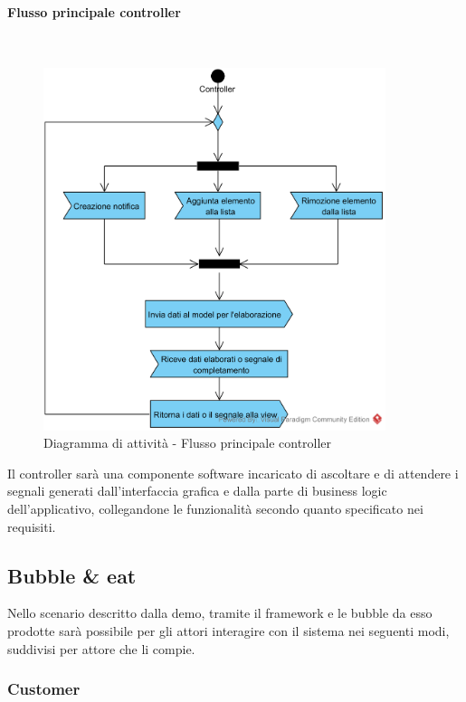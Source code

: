 \paragraph{Flusso principale controller}\mbox{}\\
\nopagebreak
\begin{figure}[H]
	\centering
	\includegraphics[width=10cm]{../../documenti/SpecificaTecnica/diagrammi_img/attivita/todo_controller.png}
	\caption{Diagramma di attività - Flusso principale controller}
\end{figure}


Il controller sarà una componente software incaricato di ascoltare e di attendere i segnali generati dall'interfaccia grafica e dalla parte di business logic dell'applicativo, collegandone le funzionalità secondo quanto specificato nei requisiti. 

\subsection{Bubble \& eat}
Nello scenario descritto dalla demo, tramite il framework e le bubble da esso prodotte sarà possibile per gli attori interagire con il sistema nei seguenti modi, suddivisi per attore che li compie.

\subsubsection{Customer}

